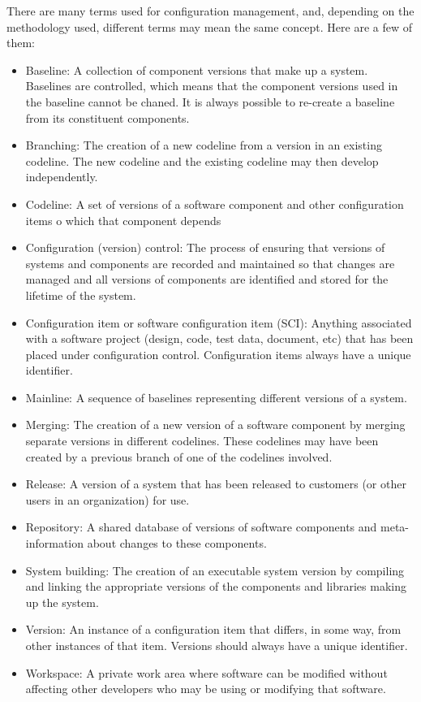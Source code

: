 There are many terms used for configuration management, and, depending on the methodology used, different terms may mean the same concept. Here are a few of them:
\begin{itemize}
    \item Baseline: A collection of component versions that make up a system. Baselines are controlled, which means that the component versions used in the baseline cannot be chaned. It is always possible to re-create a baseline from its constituent components.
    \item Branching: The creation of a new codeline from a version in an existing codeline. The new codeline and the existing codeline may then develop independently.
    \item Codeline: A set of versions of a software component and other configuration items o which that component depends
    \item Configuration (version) control: The process of ensuring that versions of systems and components are recorded and maintained so that changes are managed and all versions of components are identified and stored for the lifetime of the system.
    \item Configuration item or software configuration item (SCI): Anything associated with a software project (design, code, test data, document, etc) that has been placed under configuration control. Configuration items always have a unique identifier.
    \item Mainline: A sequence of baselines representing different versions of a system.
    \item Merging: The creation of a new version of a software component by merging separate versions in different codelines. These codelines may have been created by a previous branch of one of the codelines involved.
    \item Release: A version of a system that has been released to customers (or other users in an organization) for use.
    \item Repository: A shared database of versions of software components and meta-information about changes to these components.
    \item System building: The creation of an executable system version by compiling and linking the appropriate versions of the components and libraries making up the system.
    \item Version: An instance of a configuration item that differs, in some way, from other instances of that item. Versions should always have a unique identifier.
    \item Workspace: A private work area where software can be modified without affecting other developers who may be using or modifying that software.
\end{itemize}

